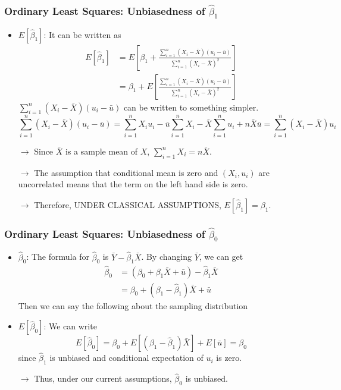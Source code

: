 \documentclass[aspectratio=169]{beamer}
\begin{document}
\begin{frame}
\frametitle{Ordinary Least Squares: Unbiasedness of $\hat{\beta}_1$}
\begin{itemize}
\item $E[\hat{\beta}_1]$: It can be written as
\small{\[
\begin{aligned}
E[\hat{\beta}_1]& = E\left[\beta_1+  \frac{\sum_{i=1}^n(X_i-\bar{X})(u_i-\bar{u})}{\sum_{i=1}^n(X_i-\bar{X})^2}\right]\\
&=\beta_1+ E\left[\frac{\sum_{i=1}^n(X_i-\bar{X})(u_i-\bar{u})}{\sum_{i=1}^n(X_i-\bar{X})^2}\right]
\end{aligned}
\]}\normalsize
$\sum_{i=1}^n(X_i-\bar{X})(u_i-\bar{u})$ can be written to something simpler.
\small{\[
\sum_{i=1}^n(X_i-\bar{X})(u_i-\bar{u})=\sum_{i=1}^nX_iu_i-\bar{u}\sum_{i=1}^n X_i-\bar{X}\sum_{i=1}^nu_i+n\bar{X}\bar{u} = \sum_{i=1}^n(X_i-\bar{X})u_i
\]}\normalsize
\item[$\to$] Since $\bar{X}$ is a sample mean of $X$, $\sum_{i=1}^nX_i=n\bar{X}$. \\
\item[$\to$] The assumption that conditional mean is zero and $(X_i, u_i)$ are uncorrelated means that the term on the left hand side is zero. 
\item[$\to$] Therefore, UNDER CLASSICAL ASSUMPTIONS, $E[\hat{\beta}_1]=\beta_1$.

\end{itemize}
\end{frame}


\begin{frame}
\frametitle{Ordinary Least Squares: Unbiasedness of $\hat{\beta}_0$}
\begin{itemize}
\item $\hat{\beta}_0$: The formula for $\hat{\beta}_0$ is $\bar{Y}-\hat{\beta}_1\bar{X}$. By changing $\bar{Y}$, we can get
\[
\begin{aligned}
\hat{\beta}_0&=(\beta_0+\beta_1\bar{X}+\bar{u})-\hat{\beta}_1\bar{X}\\
&=\beta_0+(\beta_1-\hat{\beta}_1)\bar{X}+\bar{u}
\end{aligned}
\]
Then we can say the following about the sampling distribution
\item $E[\hat{\beta}_0]$: We can write
\[
E[\hat{\beta}_0]=\beta_0+E[(\beta_1-\hat{\beta}_1)\bar{X}]+E[\bar{u}]=\beta_0
\]
since $\hat{\beta}_1$ is unbiased and conditional expectation of $u_i$ is zero. 
\item[$\to$]Thus, under our current assumptions, $\hat{\beta}_0$ is unbiased. 
\end{itemize}
\end{frame}
\end{document}
